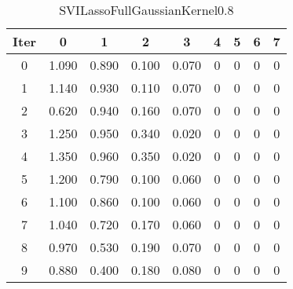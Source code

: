 \begin{table}
	\begin{center}
		\begin{tabular}{|c|c|c|c|c|c|c|c|c|}
			\hline
			Iter & 0 & 1 & 2 & 3 & 4 & 5 & 6 & 7 \\
			\hline
			0 & 1.090 & 0.890 & 0.100 & 0.070 & 0 & 0 & 0 & 0 \\
			\hline
			1 & 1.140 & 0.930 & 0.110 & 0.070 & 0 & 0 & 0 & 0 \\
			\hline
			2 & 0.620 & 0.940 & 0.160 & 0.070 & 0 & 0 & 0 & 0 \\
			\hline
			3 & 1.250 & 0.950 & 0.340 & 0.020 & 0 & 0 & 0 & 0 \\
			\hline
			4 & 1.350 & 0.960 & 0.350 & 0.020 & 0 & 0 & 0 & 0 \\
			\hline
			5 & 1.200 & 0.790 & 0.100 & 0.060 & 0 & 0 & 0 & 0 \\
			\hline
			6 & 1.100 & 0.860 & 0.100 & 0.060 & 0 & 0 & 0 & 0 \\
			\hline
			7 & 1.040 & 0.720 & 0.170 & 0.060 & 0 & 0 & 0 & 0 \\
			\hline
			8 & 0.970 & 0.530 & 0.190 & 0.070 & 0 & 0 & 0 & 0 \\
			\hline
			9 & 0.880 & 0.400 & 0.180 & 0.080 & 0 & 0 & 0 & 0 \\
			\hline
		\end{tabular}
	\end{center}
	\caption{SVILassoFullGaussianKernel0.8}
\end{table}